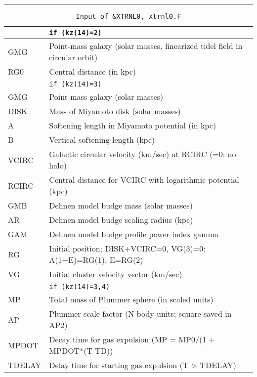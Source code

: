 \hrule
\noindent
\begin{longtable}{@{}p{1.5cm}p{13.0cm}}
\caption{\texttt{Input of \&XTRNL0, xtrnl0.F}}
\label{table:indata}\\\hline
& \texttt{if (kz(14)=2)} \\\hline
GMG    & Point-mass galaxy (solar masses, linearized tidel field in circular orbit) \\
RG0    & Central distance (in kpc) \\\hline
       & \texttt{if (kz(14)=3)} \\\hline
GMG    & Point-mass galaxy (solar masses) \\
DISK   & Mass of Miyamoto disk (solar masses) \\
A      & Softening length in Miyamoto potential (in kpc) \\
B      & Vertical softening length (kpc) \\
VCIRC  & Galactic circular velocity (km/sec) at RCIRC (=0: no halo) \\
RCIRC  & Central distance for VCIRC with logarithmic potential (kpc) \\
GMB    & Dehnen model budge mass (solar masses)\\
AR     & Dehnen model budge scaling radius (kpc)\\
GAM    & Dehnen model budge profile power index gamma \\  
RG     & Initial position; DISK+VCIRC=0, VG(3)=0: A(1+E)=RG(1), E=RG(2) \\
VG     & Initial cluster velocity vector (km/sec) \\\hline
       & \texttt{if (kz(14)=3,4)} \\\hline
MP     & Total mass of Plummer sphere (in scaled units) \\
AP     & Plummer scale factor (N-body units; square saved in AP2) \\
MPDOT  & Decay time for gas expulsion (MP = MP0/(1 + MPDOT*(T-TD)) \\
TDELAY & Delay time for starting gas expulsion (T > TDELAY) \\
\end{longtable}

